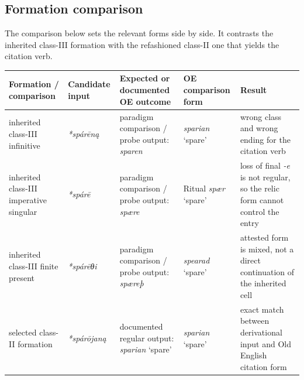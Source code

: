 \documentclass[
  british,
  a4paper,
  openany]{book}
\newcounter{none} %
\providecommand{\Recon}[1]{\emph{*#1}}
{\catcode`→=\active \global\def→{\ensuremath{\rightarrow}}}
\providecommand{\Recon}[1]{\emph{*#1}}
{\catcode`→=\active \global\def→{\ensuremath{\rightarrow}}}
\begin{document}
\subsection{Formation comparison}\label{formation-comparison-4}

The comparison below sets the relevant forms side by side. It contrasts
the inherited class-III formation with the refashioned class-II one that
yields the citation verb.

{\def\LTcaptype{none} %
\begin{longtable}[]{@{}
  >{\raggedright\arraybackslash}p{}
  >{\raggedright\arraybackslash}p{}
  >{\raggedright\arraybackslash}p{}
  >{\raggedright\arraybackslash}p{}
  >{\raggedright\arraybackslash}p{}@{}}
\toprule\noalign{}
\begin{minipage}[b]{\linewidth}\raggedright
Formation / comparison
\end{minipage} & \begin{minipage}[b]{\linewidth}\raggedright
Candidate input
\end{minipage} & \begin{minipage}[b]{\linewidth}\raggedright
Expected or documented OE outcome
\end{minipage} & \begin{minipage}[b]{\linewidth}\raggedright
OE comparison form
\end{minipage} & \begin{minipage}[b]{\linewidth}\raggedright
Result
\end{minipage} \\
\midrule\noalign{}
\endhead
\bottomrule\noalign{}
\endlastfoot
inherited class-III infinitive & {\emph{*spárēną}} & paradigm comparison
/ probe output: {\emph{sparen}} & {\emph{sparian}} `spare' & wrong class
and wrong ending for the citation verb \\
inherited class-III imperative singular & \Recon{spárē} & paradigm
comparison / probe output: {\emph{spære}} & Ritual {\emph{spær}} `spare'
& loss of final \emph{-e} is not regular, so the relic form cannot
control the entry \\
inherited class-III finite present & \Recon{spárēθi} & paradigm
comparison / probe output: {\emph{spæreþ}} & {\emph{spearad}} `spare' &
attested form is mixed, not a direct continuation of the inherited
cell \\
selected class-II formation & {\emph{*spárōjaną}} & documented regular
output: {\emph{sparian}} `spare' & {\emph{sparian}} `spare' & exact
match between derivational input and Old English citation form \\
\end{longtable}
}
\end{document}
